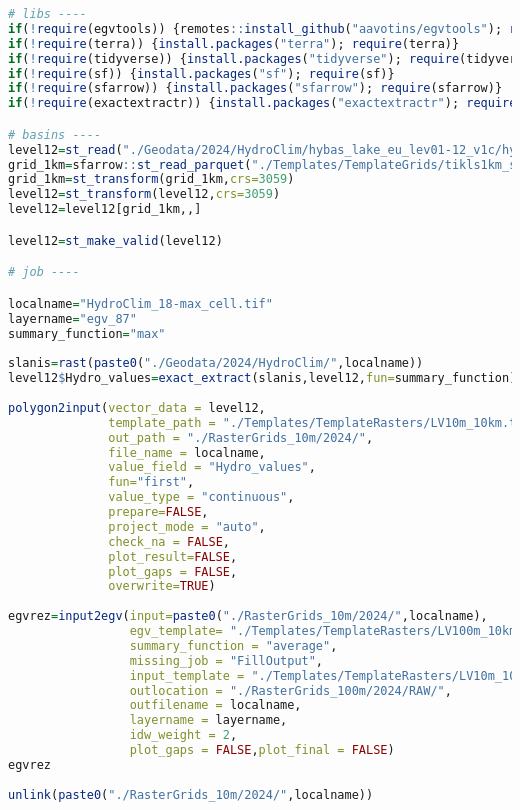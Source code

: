 \documentclass[
]{book}
\begin{document}
\begin{lstlisting}[language=R]
# libs ----
if(!require(egvtools)) {remotes::install_github("aavotins/egvtools"); require(egvtools)}
if(!require(terra)) {install.packages("terra"); require(terra)}
if(!require(tidyverse)) {install.packages("tidyverse"); require(tidyverse)}
if(!require(sf)) {install.packages("sf"); require(sf)}
if(!require(sfarrow)) {install.packages("sfarrow"); require(sfarrow)}
if(!require(exactextractr)) {install.packages("exactextractr"); require(exactextractr)}

# basins ----
level12=st_read("./Geodata/2024/HydroClim/hybas_lake_eu_lev01-12_v1c/hybas_lake_eu_lev12_v1c.shp")
grid_1km=sfarrow::st_read_parquet("./Templates/TemplateGrids/tikls1km_sauzeme.parquet")
grid_1km=st_transform(grid_1km,crs=3059)
level12=st_transform(level12,crs=3059)
level12=level12[grid_1km,,]

level12=st_make_valid(level12)

# job ----

localname="HydroClim_18-max_cell.tif"
layername="egv_87"
summary_function="max"
  
slanis=rast(paste0("./Geodata/2024/HydroClim/",localname))
level12$Hydro_values=exact_extract(slanis,level12,fun=summary_function)
  
polygon2input(vector_data = level12,
              template_path = "./Templates/TemplateRasters/LV10m_10km.tif",
              out_path = "./RasterGrids_10m/2024/",
              file_name = localname,
              value_field = "Hydro_values",
              fun="first",
              value_type = "continuous",
              prepare=FALSE,
              project_mode = "auto",
              check_na = FALSE,
              plot_result=FALSE,
              plot_gaps = FALSE,
              overwrite=TRUE)
  
egvrez=input2egv(input=paste0("./RasterGrids_10m/2024/",localname),
                 egv_template= "./Templates/TemplateRasters/LV100m_10km.tif",
                 summary_function = "average",
                 missing_job = "FillOutput",
                 input_template = "./Templates/TemplateRasters/LV10m_10km.tif",
                 outlocation = "./RasterGrids_100m/2024/RAW/",
                 outfilename = localname,
                 layername = layername,
                 idw_weight = 2,
                 plot_gaps = FALSE,plot_final = FALSE)
egvrez
  
unlink(paste0("./RasterGrids_10m/2024/",localname))
\end{lstlisting}
\end{document}
